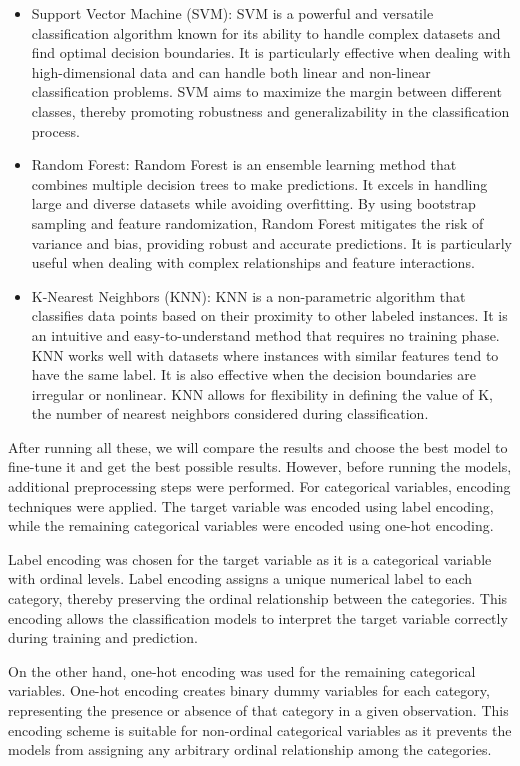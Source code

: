 \documentclass[11pt]{article} %
\begin{document}
\begin{itemize}
	\item Support Vector Machine (SVM): SVM is a powerful and versatile classification algorithm known for its ability to handle complex datasets and find optimal decision boundaries. It is particularly effective when dealing with high-dimensional data and can handle both linear and non-linear classification problems. SVM aims to maximize the margin between different classes, thereby promoting robustness and generalizability in the classification process.
	\item Random Forest: Random Forest is an ensemble learning method that combines multiple decision trees to make predictions. It excels in handling large and diverse datasets while avoiding overfitting. By using bootstrap sampling and feature randomization, Random Forest mitigates the risk of variance and bias, providing robust and accurate predictions. It is particularly useful when dealing with complex relationships and feature interactions.
	\item K-Nearest Neighbors (KNN): KNN is a non-parametric algorithm that classifies data points based on their proximity to other labeled instances. It is an intuitive and easy-to-understand method that requires no training phase. KNN works well with datasets where instances with similar features tend to have the same label. It is also effective when the decision boundaries are irregular or nonlinear. KNN allows for flexibility in defining the value of K, the number of nearest neighbors considered during classification.
\end{itemize}

After running all these, we will compare the results and choose the best model to fine-tune it and get the best possible results. However, before running the models, additional preprocessing steps were performed. For categorical variables, encoding techniques were applied. The target variable was encoded using label encoding, while the remaining categorical variables were encoded using one-hot encoding.

Label encoding was chosen for the target variable as it is a categorical variable with ordinal levels. Label encoding assigns a unique numerical label to each category, thereby preserving the ordinal relationship between the categories. This encoding allows the classification models to interpret the target variable correctly during training and prediction.

On the other hand, one-hot encoding was used for the remaining categorical variables. One-hot encoding creates binary dummy variables for each category, representing the presence or absence of that category in a given observation. This encoding scheme is suitable for non-ordinal categorical variables as it prevents the models from assigning any arbitrary ordinal relationship among the categories.
\end{document}
